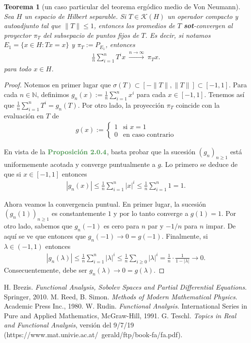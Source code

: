 \documentclass[11pt]{report}
\theoremstyle{colored}
\newtheorem{theorem}{Teorema}[section]
\newcommand{\N}{\mathbb{N}}
\newcommand{\paint}[1]{\color{color}{#1}}
\newcommand{\tpaint}[1]{\paint{\textbf{#1}}}
\begin{document}
\begin{theorem}[un caso particular del teorema ergódico medio de Von Neumann] Sea $H$ un espacio de Hilbert separable. Si $T \in \mathscr{K}(H)$ un operador compacto y autoadjunto tal que $\|T\| \leq 1$, entonces los promedios de $T$ \textbf{sot}-convergen al proyector $\pi_T$ del subsepacio de puntos fijos de $T$. Es decir, si notamos $E_1 = \{x \in H : Tx = x\}$ y $\pi_T := P_{E_1}$, entonces
\begin{align*}
\frac{1}{n}\sum_{i=1}^{n}T^ix \ \xrightarrow{n \to \infty} \ \pi_Tx.
\end{align*}
para todo $x \in H$.
\end{theorem}
\begin{proof} Notemos en primer lugar que $\sigma(T) \subset [-\|T\|,\|T\|] \subset [-1,1]$. Para cada $n \in \N$, definimos $g_n(x) := \frac{1}{n}\sum_{i=1}^nx^i$ para cada $x \in [-1,1]$. Tenemos así que $\frac{1}{n}\sum_{i=1}^{n}T^i = g_n(T)$. Por otro lado, la proyección $\pi_T$ coincide con la evaluación en $T$ de 
\begin{align*}
g(x) := \begin{cases}
1 &\text{si $x = 1$}\\
0 &\text{en caso contrario}
\end{cases}
\end{align*}

En vista de la $\tpaint{Proposición 2.0.4}$, basta probar que la sucesión $(g_n)_{n \geq 1}$ está uniformemente acotada y converge puntualmente a $g$. Lo primero se deduce de que si $x \in [-1,1]$ entonces
\begin{align*}
|g_n(x)| \leq \frac{1}{n}\sum_{i=1}^n|x|^i \leq \frac{1}{n}\sum_{i=1}^n1 = 1.
\end{align*}

Ahora veamos la convergencia puntual. En primer lugar, la sucesión $(g_n(1))_{n \geq 1}$ es constantemente $1$ y por lo tanto converge a $g(1) = 1$. Por otro lado, sabemos que $g_n(-1)$ es cero para $n$ par y $-1/n$ para $n$ impar. De aquí se ve que entonces que $g_n(-1) \to 0 = g(-1)$. Finalmente, si $\lambda \in (-1,1)$ entonces
\begin{align*}
|g_n(\lambda)| \leq \frac{1}{n}\sum_{i=1}^n|\lambda|^i \leq \frac{1}{n}\sum_{i \geq 0}|\lambda|^i = \frac{1}{n} \cdot \frac{1}{1-|\lambda|} \to 0.
\end{align*}
Consecuentemente, debe ser $g_n(\lambda) \to 0 = g(\lambda)$.
\end{proof}

\begin{thebibliography}{}
 H. Brezis. \textit{Functional Analysis, Sobolev Spaces and Partial Differential Equations}. Springer, 2010.
 M. Reed, B. Simon. \textit{Methods of Modern Mathematical Physics}.  Academic Press Inc., 1980.
 W. Rudin. \textit{Functional Analysis}. International Series in Pure and Applied Mathematics, McGraw-Hill, 1991.
 G. Teschl. \textit{Topics in Real and Functional Analysis}, versión del 9/7/19 (https://www.mat.univie.ac.at/~gerald/ftp/book-fa/fa.pdf).

\end{thebibliography}
\end{document}
